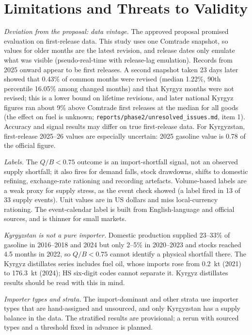 \documentclass[conference]{IEEEtran}
\begin{document}
\section{Limitations and Threats to Validity}\label{sec:limits}

\textit{Deviation from the proposal: data vintage.} The approved proposal promised evaluation on first-release data. This study uses one Comtrade snapshot, so values for older months are the latest revision, and release dates only emulate what was visible (pseudo-real-time with release-lag emulation). Records from 2025 onward appear to be first releases. A second snapshot taken 23 days later showed that 0.43\% of common months were revised (median 1.22\%, 90th percentile 16.05\% among changed months) and that Kyrgyz months were not revised; this is a lower bound on lifetime revisions, and later national Kyrgyz figures ran about 9\% above Comtrade first releases at the median for all goods (the effect on fuel is unknown; \texttt{reports/phase2/unresolved\_issues.md}, item 1). Accuracy and signal results may differ on true first-release data. For Kyrgyzstan, first-release 2025--26 values are especially uncertain: 2025 gasoline value is 0.78 of the official figure.

\textit{Labels.} The $Q/B<0.75$ outcome is an import-shortfall signal, not an observed supply shortfall; it also fires for demand falls, stock drawdowns, shifts to domestic refining, exchange-rate rationing and recording artefacts. Volume-based labels are a weak proxy for supply stress, as the event check showed (a label fired in 13 of 33 supply events). Unit values are in US dollars and miss local-currency rationing. The event-calendar label is built from English-language and official sources, and is thinner for small markets.

\textit{Kyrgyzstan is not a pure importer.} Domestic production supplied 23--33\% of gasoline in 2016--2018 and 2024 but only 2--5\% in 2020--2023 and stocks reached 4.5 months in 2022, so $Q/B<0.75$ cannot identify a physical shortfall there. The Kyrgyz distillates series includes fuel oil, whose imports rose from 0.2~kt (2021) to 176.3~kt (2024); HS six-digit codes cannot separate it. Kyrgyz distillates results should be read with this in mind.

\textit{Importer types and strata.} The import-dominant and other strata use importer types that are hand-assigned and unsourced, and only Kyrgyzstan has a supply balance in the data. The stratified results are provisional; a rerun with sourced types and a threshold fixed in advance is planned.
\end{document}
